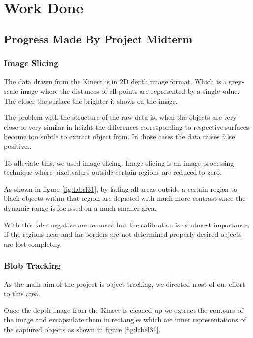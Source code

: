 \chapter{Work Done}

\section{Progress Made By Project Midterm}

\subsection{Image Slicing}
The data drawn from the Kinect is in 2D depth image format. Which is a grey-scale image where the distances of all points are represented by a single value. The closer the surface the brighter it shows on the image.

The problem with the structure of the raw data is, when the objects are very close or very similar in height the differences corresponding to respective surfaces become too subtle  to extract object from. In those cases the data raises false positives.

To alleviate this, we used image slicing. Image slicing is an image processing technique where pixel values outside certain regions are reduced to zero.

As shown in figure \ref{fig:label31}, by fading all areas outside a certain region to black objects within that region are depicted with much more contrast since the dynamic range is focussed on a much smaller area. 

With this false negative are removed but the calibration is of utmost importance. If the regions near and far borders are not determined properly desired objects are lost completely.
\subsection{Blob Tracking}
As the main aim of the project is object tracking, we directed most of our effort to this area.

Once the depth image from the Kinect is cleaned up we extract the contours of the image and encapsulate them in rectangles which are inner representations of the captured objects as shown in figure \ref{fig:label31}.

